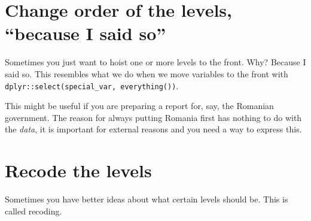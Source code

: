 \documentclass[
]{book}
\newenvironment{Shaded}{\begin{snugshade}}{\end{snugshade}}
\newcommand{\CommentTok}[1]{\textcolor[rgb]{0.56,0.35,0.01}{\textit{#1}}}
\newcommand{\KeywordTok}[1]{\textcolor[rgb]{0.13,0.29,0.53}{\textbf{#1}}}
\newcommand{\NormalTok}[1]{#1}
\newcommand{\OperatorTok}[1]{\textcolor[rgb]{0.81,0.36,0.00}{\textbf{#1}}}
\newcommand{\StringTok}[1]{\textcolor[rgb]{0.31,0.60,0.02}{#1}}
\begin{document}
\hypertarget{change-order-of-the-levels-because-i-said-so}{%
\section{Change order of the levels, ``because I said so''}\label{change-order-of-the-levels-because-i-said-so}}

Sometimes you just want to hoist one or more levels to the front. Why? Because I said so. This resembles what we do when we move variables to the front with \texttt{dplyr::select(special\_var,\ everything())}.

\begin{Shaded}
\end{Shaded}

This might be useful if you are preparing a report for, say, the Romanian government. The reason for always putting Romania first has nothing to do with the \emph{data}, it is important for external reasons and you need a way to express this.

\hypertarget{recode-the-levels}{%
\section{Recode the levels}\label{recode-the-levels}}

Sometimes you have better ideas about what certain levels should be. This is called recoding.

\begin{Shaded}
\end{Shaded}
\end{document}

